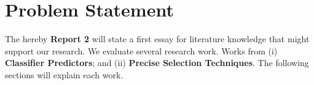 \section{Problem Statement}

The hereby \textbf{Report 2} will state a first essay for literature knowledge that might support our research. We evaluate several research work. Works from (i) \textbf{Classifier Predictors}; and (ii) \textbf{Precise Selection Techniques}. The following sections will explain each work.